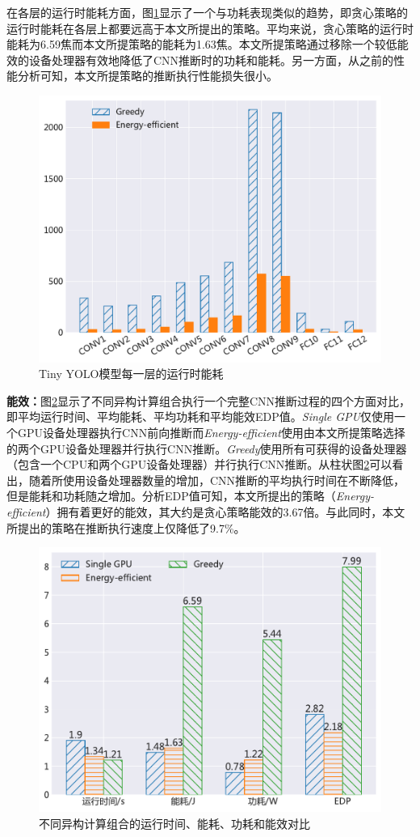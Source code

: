 在各层的运行时能耗方面，图\ref{figure:figure34}显示了一个与功耗表现类似的趋势，即贪心策略的运行时能耗在各层上都要远高于本文所提出的策略。平均来说，贪心策略的运行时能耗为6.59焦而本文所提策略的能耗为1.63焦。本文所提策略通过移除一个较低能效的设备处理器有效地降低了CNN推断时的功耗和能耗。另一方面，从之前的性能分析可知，本文所提策略的推断执行性能损失很小。

\begin{figure}[htbp]
    \centering
    \includegraphics[height=0.4\textwidth]{figures/hc_energy.pdf}
    \caption{Tiny YOLO模型每一层的运行时能耗}\label{figure:figure34}
\end{figure}

\textbf{能效：}图\ref{figure:figure35}显示了不同异构计算组合执行一个完整CNN推断过程的四个方面对比，即平均运行时间、平均能耗、平均功耗和平均能效EDP值。\emph{Single GPU}仅使用一个GPU设备处理器执行CNN前向推断而\emph{Energy-efficient}使用由本文所提策略选择的两个GPU设备处理器并行执行CNN推断。\emph{Greedy}使用所有可获得的设备处理器（包含一个CPU和两个GPU设备处理器）并行执行CNN推断。从柱状图\ref{figure:figure35}可以看出，随着所使用设备处理器数量的增加，CNN推断的平均执行时间在不断降低，但是能耗和功耗随之增加。分析EDP值可知，本文所提出的策略（\emph{Energy-efficient}）拥有着更好的能效，其大约是贪心策略能效的3.67倍。与此同时，本文所提出的策略在推断执行速度上仅降低了9.7\%。

\begin{figure}[htbp]
    \centering
    \includegraphics[height=0.4\textwidth]{figures/hc_gpu.pdf}
    \caption{不同异构计算组合的运行时间、能耗、功耗和能效对比}\label{figure:figure35}
\end{figure}


